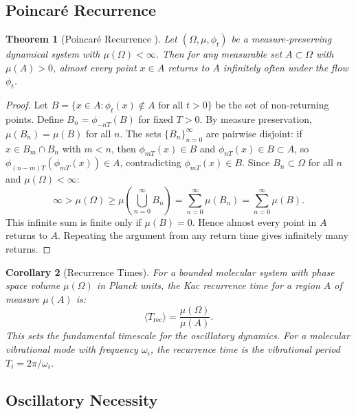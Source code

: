\documentclass[11pt,twocolumn,a4paper]{article}
\newtheorem{theorem}{Theorem}[section]
\newtheorem{corollary}[theorem]{Corollary}
\theoremstyle{definition}
\theoremstyle{remark}
\begin{document}
\subsection{Poincar\'e Recurrence}

\begin{theorem}[Poincar\'e Recurrence {\citep{poincare1890}}]
\label{thm:poincare}
Let $(\Omega, \mu, \phi_t)$ be a measure-preserving dynamical system with $\mu(\Omega) < \infty$. Then for any measurable set $A \subset \Omega$ with $\mu(A) > 0$, almost every point $x \in A$ returns to $A$ infinitely often under the flow $\phi_t$.
\end{theorem}

\begin{proof}
Let $B = \{x \in A : \phi_t(x) \notin A \text{ for all } t > 0\}$ be the set of non-returning points. Define $B_n = \phi_{-nT}(B)$ for fixed $T > 0$. By measure preservation, $\mu(B_n) = \mu(B)$ for all $n$. The sets $\{B_n\}_{n=0}^\infty$ are pairwise disjoint: if $x \in B_m \cap B_n$ with $m < n$, then $\phi_{mT}(x) \in B$ and $\phi_{nT}(x) \in B \subset A$, so $\phi_{(n-m)T}(\phi_{mT}(x)) \in A$, contradicting $\phi_{mT}(x) \in B$. Since $B_n \subset \Omega$ for all $n$ and $\mu(\Omega) < \infty$:
\begin{equation}
\infty > \mu(\Omega) \geq \mu\left(\bigcup_{n=0}^\infty B_n\right) = \sum_{n=0}^\infty \mu(B_n) = \sum_{n=0}^\infty \mu(B).
\end{equation}
This infinite sum is finite only if $\mu(B) = 0$. Hence almost every point in $A$ returns to $A$. Repeating the argument from any return time gives infinitely many returns.
\end{proof}

\begin{corollary}[Recurrence Times]
\label{cor:recurrence_times}
For a bounded molecular system with phase space volume $\mu(\Omega)$ in Planck units, the Kac recurrence time \citep{kac1947} for a region $A$ of measure $\mu(A)$ is:
\begin{equation}
\langle T_{\mathrm{rec}} \rangle = \frac{\mu(\Omega)}{\mu(A)}.
\end{equation}
This sets the fundamental timescale for the oscillatory dynamics. For a molecular vibrational mode with frequency $\omega_i$, the recurrence time is the vibrational period $T_i = 2\pi/\omega_i$.
\end{corollary}

\subsection{Oscillatory Necessity}
\end{document}
